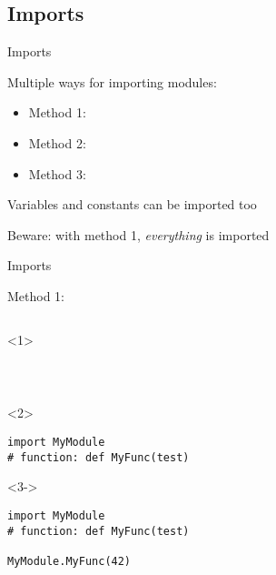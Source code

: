 \subsection{Imports}

\begin{frame}[fragile]{Imports}

  Multiple ways for importing modules:

  \begin{itemize}
    \item<1-> Method 1: 
    \item<2-> Method 2: 
    \item<3-> Method 3: 
  \end{itemize}

  \bigskip

   Variables and constants can be imported too

  \medskip

   Beware: with method 1, \textit{everything} is imported

\end{frame}


\begin{frame}[fragile]{Imports}

  Method 1: 

  \begin{columns}[onlytextwidth]
    \begin{column}{\textwidth}

      \begin{onlyenv}<1>
        \begin{lstlisting}[style=python]



 \end{lstlisting}
      \end{onlyenv}

      \begin{onlyenv}<2>
        \begin{lstlisting}[style=python]
import MyModule
# function: def MyFunc(test)

 \end{lstlisting}
      \end{onlyenv}

      \begin{onlyenv}<3->
        \begin{lstlisting}[style=python]
import MyModule
# function: def MyFunc(test)

MyModule.MyFunc(42) \end{lstlisting}
      \end{onlyenv}

    \end{column}
  \end{columns}

\end{frame}



